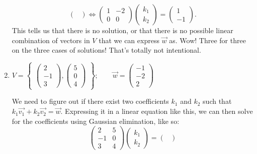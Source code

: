 \documentclass{article}
\begin{document}
\begin{enumerate}
\begin{solution}
\[\begin{pmatrix}
            \end{pmatrix} \Longleftrightarrow \begin{pmatrix}
                1&-2 \\ 0&0
            \end{pmatrix}\begin{pmatrix}
                k_1\\k_2
            \end{pmatrix} = \begin{pmatrix}
                1\\-1
            \end{pmatrix}.
        \] This tells us that there is no solution, or that there is no possible linear combination of vectors in \(V\) that we can express \(\overrightarrow{w}\) as. Wow! Three for three on the three cases of solutions! That's totally not intentional. 
    \end{solution}
    \pagebreak
    \item \(V = \begin{Bmatrix}
        \begin{pmatrix}
            2\\-1\\3
        \end{pmatrix},\begin{pmatrix}
            5\\0\\4
        \end{pmatrix}
    \end{Bmatrix}; \qquad \overrightarrow{w} = \begin{pmatrix}
        -1\\-2\\2
    \end{pmatrix}\)\begin{solution}
        We need to figure out if there exist two coefficients \(k_1\) and \(k_2\) such that \(k_1\overrightarrow{v_1} + k_2\overrightarrow{v_2} = \overrightarrow{w}\).
        Expressing it in a linear equation like this, we can then solve for the coefficients using Gaussian elimination, like so:\[
            \begin{pmatrix}
                2&5\\-1&0\\3&4
            \end{pmatrix}\begin{pmatrix}
                k_1\\k_2
            \end{pmatrix} = \begin{pmatrix}

\end{pmatrix}\]
\end{solution}
\end{enumerate}
\end{document}
